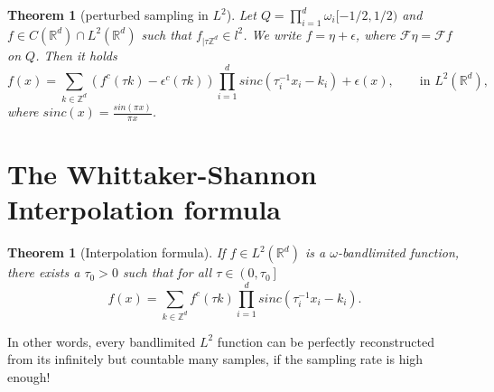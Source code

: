 \documentclass[a4paper, 11pt]{scrreprt}
\newtheorem{theorem}[defi]{Theorem}
\newcommand{\RR}{\mathbb{R}}
\newcommand{\ZZ}{\mathbb{Z}}
\newcommand{\FF}{\mathcal{F}}
\newcommand{\student}[1]{\marginnote{{\normalfont\bf #1}}}
\begin{document}
\begin{theorem}[perturbed sampling in \(L^2\)]
\label{th:perturbed sampling}
Let \(Q = \prod_{i=1}^d \omega_i[-1/2, 1/2)\) and \\
 \({f\in C(\RR^d)\cap L^2(\RR^d)}\) such that \(f_{|\tau\ZZ^d} \in l^2\). We write \(f=\eta + \epsilon\), where \(\FF\eta = \FF f\) on \(Q\). Then it holds
\begin{equation}
	f(x) = \sum_{k\in\ZZ^d} (f^c(\tau k)-\epsilon^c(\tau k))\prod _{i=1}^d sinc(\tau_i^{-1}x_i-k_i)+\epsilon(x), \qquad \text{in } L^2(\RR^d),
\end{equation}
where \(sinc(x) = \frac{sin(\pi x)}{\pi x}\).
\end{theorem}

\newpage
\section{The Whittaker-Shannon Interpolation formula}
\student{Manuela}
\begin{theorem}[Interpolation formula]
\label{th:interpolation}
If \(f \in L^2(\RR^d)\) is a \(\omega\)-bandlimited function, there exists a \(\tau_0 > 0\) such that for all \(\tau \in \left(0,\tau_0\right]\)
\begin{equation}
	f(x) = \sum_{k \in \ZZ^d} f^c(\tau k) \prod_{i=1}^d sinc\left(\tau_i^{-1} x_i -k_i\right).
\end{equation}
\end{theorem}
In other words, every bandlimited \(L^2\) function can be perfectly reconstructed from its infinitely but countable many samples, if the sampling rate is high enough!\\
\end{document}
